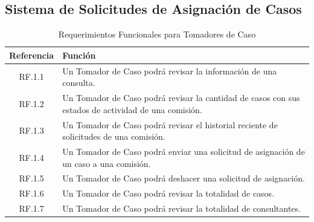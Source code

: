\subsection{Sistema de Solicitudes de Asignación de Casos}

\begin{table}[H]
    \centering
    \begin{tabular}{|c|p{10cm}|}
        \hline
        \textbf{Referencia} & \textbf{Función} \\
        \hline
        RF.1.1 & Un Tomador de Caso podrá revisar la información de una consulta. \\
        \hline
        RF.1.2 & Un Tomador de Caso podrá revisar la cantidad de casos con sus estados de actividad de una comisión. \\
        \hline
        RF.1.3 & Un Tomador de Caso podrá revisar el historial reciente de solicitudes de una comisión. \\
        \hline
        RF.1.4 & Un Tomador de Caso podrá enviar una solicitud de asignación de un caso a una comisión. \\
        \hline
        RF.1.5 & Un Tomador de Caso podrá deshacer una solicitud de asignación. \\
        \hline
        RF.1.6 & Un Tomador de Caso podrá revisar la totalidad de casos. \\
        \hline
        RF.1.7 & Un Tomador de Caso podrá revisar la totalidad de consultantes. \\
        \hline
    \end{tabular}
    \caption{Requerimientos Funcionales para Tomadores de Caso}
    \label{tab:rf-tomadores-caso}
\end{table}



